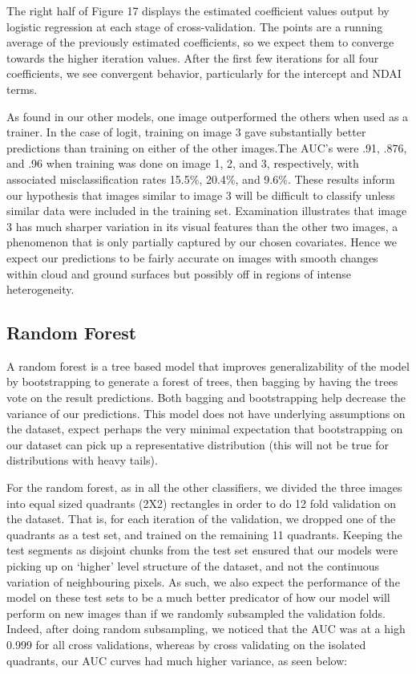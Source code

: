 \documentclass{article}\usepackage[]{graphicx}\usepackage[]{color}
\begin{document}
The right half of Figure 17 displays the estimated coefficient values output by logistic regression at each stage of cross-validation. The points are a running average of the previously estimated coefficients, so we expect them to converge towards the higher iteration values. After the first few iterations for all four coefficients, we see convergent behavior, particularly for the intercept and NDAI terms. 

As found in our other models, one image outperformed the others when used as a trainer. In the case of logit, training on image 3 gave substantially better predictions than training on either of the other images.The AUC's were .91, .876, and .96 when training was done on image 1, 2, and 3, respectively, with associated misclassification rates 15.5$\%$, 20.4$\%$, and 9.6$\%$. These results inform our hypothesis that images similar to image 3 will be difficult to classify unless similar data were included in the training set. Examination illustrates that image 3 has much sharper variation in its visual features than the other two images, a phenomenon that is only partially captured by our chosen covariates. Hence we expect our predictions to be fairly accurate on images with smooth changes within cloud and ground surfaces but possibly off in regions of intense heterogeneity.

\subsection{Random Forest}

A random forest is a tree based model that improves generalizability of the model by bootstrapping to generate a forest of trees, then bagging by having the trees vote on the result predictions.  Both bagging and bootstrapping help decrease the variance of our predictions. This model does not have underlying assumptions on the dataset, expect perhaps the very minimal expectation that bootstrapping on our dataset can pick up a representative distribution (this will not be true for distributions with heavy tails).  

For the random forest, as in all the other classifiers, we divided the three images into equal sized quadrants (2X2) rectangles in order to do 12 fold validation on the dataset.  That is, for each iteration of the validation, we dropped one of the quadrants as a test set, and trained on the remaining 11 quadrants.  Keeping the test segments as disjoint chunks from the test set ensured that our models were picking up on `higher' level structure of the dataset, and not the continuous variation of neighbouring pixels.  As such, we also expect the performance of the model on these test sets to be a much better predicator of how our model will perform on new images than if we randomly subsampled the validation folds.  Indeed, after doing random subsampling, we noticed that the AUC was at a high 0.999 for all cross validations, whereas by cross validating on the isolated quadrants, our AUC curves had much higher variance, as seen below: \\
\end{document}
